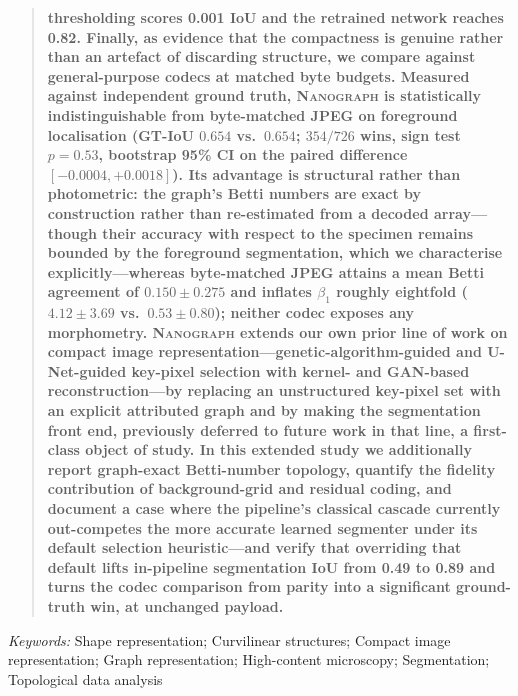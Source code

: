 \documentclass[10pt,a4paper]{article}
\newcommand{\method}{\textnormal{\textsc{Nanograph}}\xspace}
\renewenvironment{abstract}
  {\begin{quote}\small\bfseries\noindent}
  {\end{quote}}
\newenvironment{keywords}
  {\begin{center}\small\textit{Keywords:} }
  {\end{center}}
\begin{document}
\begin{abstract}
thresholding scores 0.001 IoU and the retrained network reaches 0.82.
Finally, as evidence that the compactness is genuine rather than an artefact
of discarding structure, we compare against general-purpose codecs at
matched byte budgets. Measured against independent
ground truth, \method is statistically indistinguishable from byte-matched
JPEG on foreground localisation (GT-IoU $0.654$ vs.\ $0.654$; $354/726$ wins,
sign test $p=0.53$, bootstrap 95\% CI on the paired difference
$[-0.0004,+0.0018]$). Its advantage is structural rather than photometric:
the graph's Betti numbers are exact by construction rather than re-estimated
from a decoded array---though their accuracy with respect to the specimen
remains bounded by the foreground segmentation, which we characterise
explicitly---whereas byte-matched JPEG attains a
mean Betti agreement of $0.150\pm0.275$ and inflates $\beta_1$ roughly
eightfold ($4.12\pm3.69$ vs.\ $0.53\pm0.80$); neither codec exposes any
morphometry.
\method extends our own prior line of work on compact image
representation---genetic-algorithm-guided and U-Net-guided key-pixel
selection with kernel- and GAN-based reconstruction---by replacing an
unstructured key-pixel set with an explicit attributed graph and by making
the segmentation front end, previously deferred to future work in that
line, a first-class object of study. In this extended study we
additionally report graph-exact Betti-number topology, quantify the
fidelity contribution of background-grid and residual coding, and document
a case where the pipeline's classical cascade currently out-competes the
more accurate learned segmenter under its default selection heuristic---and
verify that overriding that default lifts in-pipeline segmentation IoU from
0.49 to 0.89 and turns the codec comparison from parity into a significant
ground-truth win, at unchanged payload.
\end{abstract}

\begin{keywords}
Shape representation; Curvilinear structures; Compact image
representation; Graph representation; High-content microscopy;
Segmentation; Topological data analysis
\end{keywords}

\end{document}
